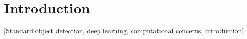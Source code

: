 \section{Introduction}\label{introduction}

{[}Standard object detection, deep learning, computational concerns,
introduction{]}
